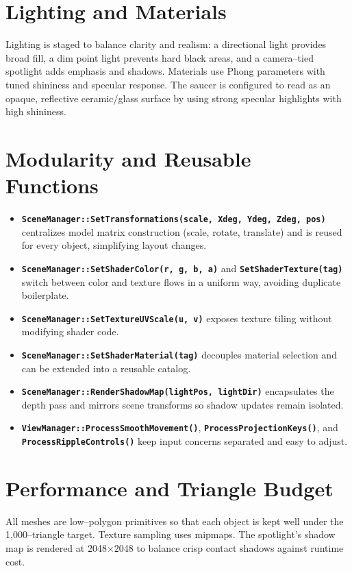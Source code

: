 \documentclass[stu,12pt]{apa7}
\begin{document}
\section{Lighting and Materials}
Lighting is staged to balance clarity and realism: a directional light provides broad fill, a dim point light prevents hard black areas, and a camera--tied spotlight adds emphasis and shadows. Materials use Phong parameters with tuned shininess and specular response. The saucer is configured to read as an opaque, reflective ceramic/glass surface by using strong specular highlights with high shininess.

\section{Modularity and Reusable Functions}
\begin{itemize}
  \item \textbf{\texttt{SceneManager::SetTransformations(scale, Xdeg, Ydeg, Zdeg, pos)}} centralizes model matrix construction (scale, rotate, translate) and is reused for every object, simplifying layout changes.
  \item \textbf{\texttt{SceneManager::SetShaderColor(r, g, b, a)}} and \textbf{\texttt{SetShaderTexture(tag)}} switch between color and texture flows in a uniform way, avoiding duplicate boilerplate.
  \item \textbf{\texttt{SceneManager::SetTextureUVScale(u, v)}} exposes texture tiling without modifying shader code.
  \item \textbf{\texttt{SceneManager::SetShaderMaterial(tag)}} decouples material selection and can be extended into a reusable catalog.
  \item \textbf{\texttt{SceneManager::RenderShadowMap(lightPos, lightDir)}} encapsulates the depth pass and mirrors scene transforms so shadow updates remain isolated.
  \item \textbf{\texttt{ViewManager::ProcessSmoothMovement()}}, \textbf{\texttt{ProcessProjectionKeys()}}, and \textbf{\texttt{ProcessRippleControls()}} keep input concerns separated and easy to adjust.
\end{itemize}

\section{Performance and Triangle Budget}
All meshes are low--polygon primitives so that each object is kept well under the 1{,}000--triangle target. Texture sampling uses mipmaps. The spotlight’s shadow map is rendered at 2048$\times$2048 to balance crisp contact shadows against runtime cost.
\end{document}
